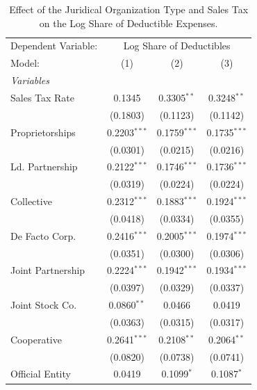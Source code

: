 \documentclass[
  12pt]{article}
\begin{document}
\begin{table}

\caption{\label{tbl-reg-ded}Effect of the Juridical Organization Type
and Sales Tax on the Log Share of Deductible Expenses.}

\begin{minipage}{\linewidth}

\begingroup
\centering
\begin{tabular}{lccc}
   \tabularnewline \midrule \midrule
   Dependent Variable: & \multicolumn{3}{c}{Log Share of Deductibles}\\
   Model:            & (1)            & (2)            & (3)\\  
   \midrule
   \emph{Variables}\\
   Sales Tax Rate    & 0.1345         & 0.3305$^{**}$  & 0.3248$^{**}$\\   
                     & (0.1803)       & (0.1123)       & (0.1142)\\   
   Proprietorships   & 0.2203$^{***}$ & 0.1759$^{***}$ & 0.1735$^{***}$\\   
                     & (0.0301)       & (0.0215)       & (0.0216)\\   
   Ld. Partnership   & 0.2122$^{***}$ & 0.1746$^{***}$ & 0.1736$^{***}$\\   
                     & (0.0319)       & (0.0224)       & (0.0224)\\   
   Collective        & 0.2312$^{***}$ & 0.1883$^{***}$ & 0.1924$^{***}$\\   
                     & (0.0418)       & (0.0334)       & (0.0355)\\   
   De Facto Corp.    & 0.2416$^{***}$ & 0.2005$^{***}$ & 0.1974$^{***}$\\   
                     & (0.0351)       & (0.0300)       & (0.0306)\\   
   Joint Partnership & 0.2224$^{***}$ & 0.1942$^{***}$ & 0.1934$^{***}$\\   
                     & (0.0397)       & (0.0329)       & (0.0337)\\   
   Joint Stock Co.   & 0.0860$^{**}$  & 0.0466         & 0.0419\\   
                     & (0.0363)       & (0.0315)       & (0.0317)\\   
   Cooperative       & 0.2641$^{***}$ & 0.2108$^{**}$  & 0.2064$^{**}$\\   
                     & (0.0820)       & (0.0738)       & (0.0741)\\   
   Official Entity   & 0.0419         & 0.1099$^{*}$   & 0.1087$^{*}$\\   

\end{tabular}
\end{minipage}
\end{table}
\end{document}
